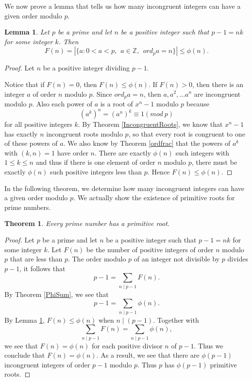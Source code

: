 \documentclass[12pt,letterpaper]{book}
\newtheorem{theorem}{Theorem}
\newtheorem{lemma}{Lemma}
\begin{document}
We now prove a lemma that tells us how many incongruent integers can
have a given order modulo $p$.

\begin{lemma}\label{PrimitiveLemma}
Let $p$ be a prime and let $n$ be a positive integer such that
$p-1=nk$ for some integer $k$. Then
$$F(n)=|\{a: 0<a<p, \ \ a \in \mathbb{Z}, \ \ ord_pa=n \}|\leq \phi(n).$$
\end{lemma}

\begin{proof}
Let $n$ be a positive integer dividing $p-1$.
\par Notice that if $F(n)=0$, then $F(n)\leq \phi(n)$.  If
$F(n)>0$, then there is an integer $a$ of order $n$ modulo $p$.
Since $ord_pa=n$, then $a,a^2,...a^n$ are incongruent modulo $p$.
Also each power of $a$ is a root of $x^n-1$ modulo $p$ because
\begin{equation*}
(a^k)^n=(a^n)^k\equiv 1(mod \ p)
\end{equation*}
for all positive integers $k$. By Theorem \ref{IncongruentRoots}, we know that $x^n-1$
has exactly $n$ incongruent roots modulo $p$, so that every root is
congruent to one of these powers of $a$.  We also know by Theorem \ref{ordfrac}
that the powers of $a^k$ with $(k,n)=1$ have order $n$.  There are
exactly $\phi(n)$ such integers with $1\leq k \leq n$ and thus if
there is one element of order $n$ modulo $p$, there must be exactly
$\phi(n)$ such positive integers less than $p$.  Hence $F(n)\leq
\phi(n)$.
\end{proof}

In the following theorem, we determine how many incongruent integers
can have a given order modulo $p$. We actually show the existence of
primitive roots for prime numbers.

\begin{theorem}
Every prime number has a primitive root.
\end{theorem}

\begin{proof}
Let $p$ be a prime and let $n$ be a positive integer such that
$p-1=nk$ for some integer $k$. Let $F(n)$ be the number of positive
integers of order $n$ modulo $p$ that are less than $p$. The order
modulo $p$ of an integer not divisible by $p$ divides $p-1$, it
follows that
\begin{equation*}
p-1=\sum_{n\mid p-1}F(n).
\end{equation*}
By Theorem \ref{PhiSum}, we see that
\begin{equation*}
p-1=\sum_{n\mid p-1}\phi(n).
\end{equation*}
By Lemma \ref{PrimitiveLemma}, $F(n)\leq \phi(n)$ when $n\mid (p-1)$.  Together with
\begin{equation*}
\sum_{n\mid p-1}F(n)=\sum_{n\mid p-1}\phi(n),
\end{equation*}
we see that $F(n)=\phi(n)$ for each positive divisor $n$ of $p-1$.
Thus we conclude that $F(n)=\phi(n)$. As a result, we see that there
are $\phi(p-1)$ incongruent integers of order $p-1$ modulo $p$. Thus $p$
has $\phi(p-1)$ primitive roots.
\end{proof}
\end{document}
